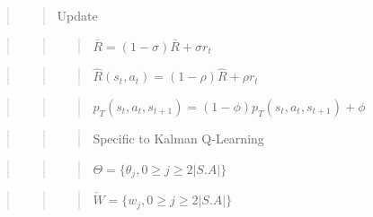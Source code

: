\documentclass[10pt,a4paper,onecolumn]{article}
\begin{document}
\begin{quote}
\begin{quote}
Update
\end{quote}
\end{quote}

\begin{quote}
\begin{quote}
\begin{quote}
\(\bar{R} = (1-\sigma) \bar{R} + \sigma r_t\)
\end{quote}
\end{quote}
\end{quote}

\begin{quote}
\begin{quote}
\begin{quote}
\(\hat{R}(s_t,a_t) =(1 - \rho) \hat{R} + \rho r_t\)
\end{quote}
\end{quote}
\end{quote}

\begin{quote}
\begin{quote}
\begin{quote}
\(p_{T}(s_t, a_t, s_{t+1}) = (1 - \phi) p_{T}(s_t, a_t, s_{t+1}) + \phi\)
\end{quote}
\end{quote}
\end{quote}

\begin{quote}
\begin{quote}
\begin{quote}
Specific to Kalman Q-Learning
\end{quote}
\end{quote}
\end{quote}

\begin{quote}
\begin{quote}
\begin{quote}
\(\Theta = \{ \theta_j, 0 \geq j \geq 2|S.A|\}\)
\end{quote}
\end{quote}
\end{quote}

\begin{quote}
\begin{quote}
\begin{quote}
\(\check{W} = \{ w_j, 0 \geq j \geq 2|S.A| \}\)
\end{quote}
\end{quote}
\end{quote}
\end{document}
